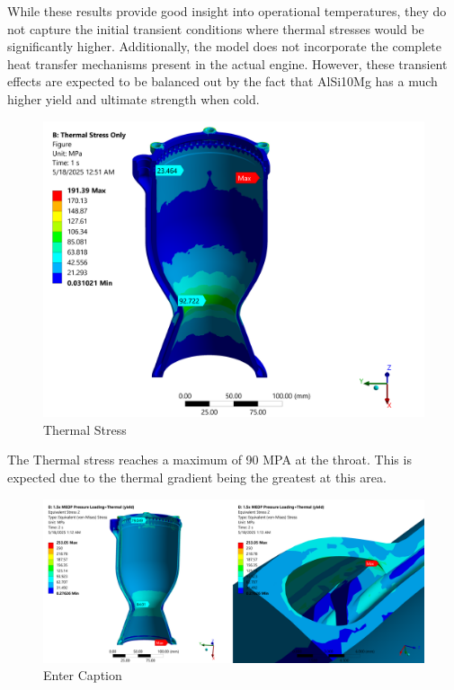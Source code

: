 While these results provide good insight into operational temperatures, they do not capture the initial transient conditions where thermal stresses would be significantly higher. Additionally, the model does not incorporate the complete heat transfer mechanisms present in the actual engine. However, these transient effects are expected to be balanced out by the fact that AlSi10Mg has a much higher yield and ultimate strength when cold.

\begin{figure}
    \centering
    \includegraphics[width=1\linewidth]{Images/themal_stress_only.png}
    \caption{Thermal Stress}
    \label{fig:Thermal Stress}
\end{figure}
The Thermal stress reaches a maximum of 90 MPA at the throat. This is expected due to the thermal gradient being the greatest at this area. 
\begin{figure}
    \centering
    \includegraphics[width=1\linewidth]{Images/Yield Pressure and Thermal Loading.png}
    \caption{Enter Caption}
    \label{fig:Yield Pressure and Thermal Loading}
\end{figure}
